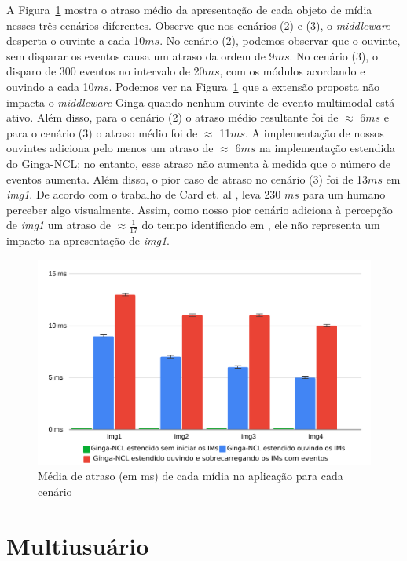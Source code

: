 A Figura~\ref{fig:average} mostra o atraso médio da apresentação de cada objeto de mídia nesses três cenários diferentes. Observe que nos cenários (2) e (3), o \textit{middleware} desperta o ouvinte a cada 10$ms$. No cenário (2), podemos observar que o ouvinte, sem disparar os eventos causa um atraso da ordem de 9$ms$. No cenário (3), o disparo de 300 eventos no intervalo de 20$ms$, com os módulos acordando e ouvindo a cada 10$ms$.
Podemos ver na Figura~\ref{fig:average} que a extensão proposta não impacta o \textit{middleware} Ginga quando nenhum ouvinte de evento multimodal está ativo. Além disso, para o cenário (2) o atraso médio resultante foi de $\approx$ 6$ms$ e para o cenário (3) o atraso médio foi de $\approx$ 11$ms$. A implementação de nossos ouvintes adiciona pelo menos um atraso de $\approx$ 6$ms$ na implementação estendida do Ginga-NCL; no entanto, esse atraso não aumenta à medida que o número de eventos aumenta. Além disso, o pior caso de atraso no cenário (3) foi de 13$ms$ em \textit{img1}. De acordo com o trabalho de Card et. al \cite{card1986model}, leva 230 $ms$ para um humano perceber algo visualmente. Assim, como nosso pior cenário adiciona à percepção de \textit{img1} um atraso de $\approx \frac{1}{17}$ do tempo identificado em \cite{card1986model}, ele não representa um impacto na apresentação de \textit{img1}.

\begin{figure}[h!]
    \centering
    \includegraphics[scale=0.60, keepaspectratio=true]{figuras/scenarios.pdf}
    \caption{Média de atraso (em ms) de cada mídia na aplicação para cada cenário}
    \label{fig:average}
\end{figure}


\section{Multiusuário}\label{sec:AvMultiusuario}

